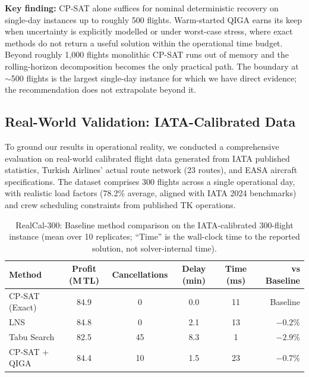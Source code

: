 \documentclass[12pt,number]{elsarticle}
\begin{document}
\textbf{Key finding:} CP-SAT alone suffices for nominal deterministic recovery on single-day instances up to roughly 500 flights. Warm-started QIGA earns its keep when uncertainty is explicitly modelled or under worst-case stress, where exact methods do not return a useful solution within the operational time budget. Beyond roughly 1{,}000 flights monolithic CP-SAT runs out of memory and the rolling-horizon decomposition becomes the only practical path. The boundary at $\sim$500 flights is the largest single-day instance for which we have direct evidence; the recommendation does not extrapolate beyond it.

\subsection{Real-World Validation: IATA-Calibrated Data}
\label{sec:realdata}

To ground our results in operational reality, we conducted a comprehensive evaluation on real-world calibrated flight data generated from IATA published statistics, Turkish Airlines' actual route network (23 routes), and EASA aircraft specifications. The dataset comprises 300 flights across a single operational day, with realistic load factors (78.2\% average, aligned with IATA 2024 benchmarks) and crew scheduling constraints from published TK operations.

\begin{table}[H]
\centering
\small
\caption{RealCal-300: Baseline method comparison on the IATA-calibrated 300-flight instance (mean over 10 replicates; ``Time'' is the wall-clock time to the reported solution, not solver-internal time).}
\label{tab:realdata}
\begin{tabular}{lccccr}
\toprule
\textbf{Method} & \textbf{Profit (M\,TL)} & \textbf{Cancellations} & \textbf{Delay (min)} & \textbf{Time (ms)} & \textbf{vs Baseline} \\
\midrule
CP-SAT (Exact) & 84.9 & 0 & 0.0 & 11 & Baseline \\
LNS & 84.8 & 0 & 2.1 & 13 & $-0.2\%$ \\
Tabu Search & 82.5 & 45 & 8.3 & 1 & $-2.9\%$ \\
CP-SAT + QIGA & 84.4 & 10 & 1.5 & 23 & $-0.7\%$ \\
\bottomrule
\end{tabular}
\end{table}
\end{document}
